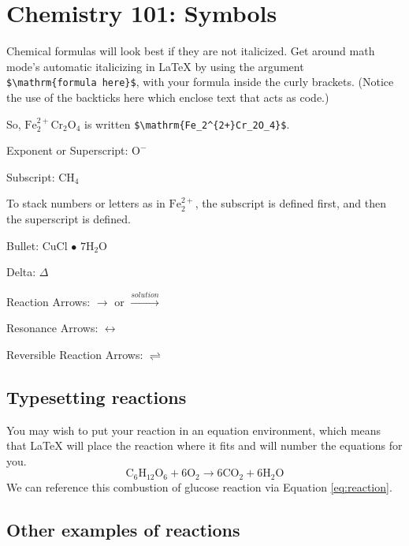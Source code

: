 \documentclass[12pt,twoside]{reedthesis}
\begin{document}
\hypertarget{chemistry-101-symbols}{%
\section{Chemistry 101: Symbols}\label{chemistry-101-symbols}}

Chemical formulas will look best if they are not italicized. Get around math mode's automatic italicizing in LaTeX by using the argument \texttt{\$\textbackslash{}mathrm\{formula\ here\}\$}, with your formula inside the curly brackets. (Notice the use of the backticks here which enclose text that acts as code.)

So, \(\mathrm{Fe_2^{2+}Cr_2O_4}\) is written \texttt{\$\textbackslash{}mathrm\{Fe\_2\^{}\{2+\}Cr\_2O\_4\}\$}.

\noindent Exponent or Superscript: \(\mathrm{O^-}\)

\noindent Subscript: \(\mathrm{CH_4}\)

To stack numbers or letters as in \(\mathrm{Fe_2^{2+}}\), the subscript is defined first, and then the superscript is defined.

\noindent Bullet: CuCl \(\bullet\) \(\mathrm{7H_{2}O}\)

\noindent Delta: \(\Delta\)

\noindent Reaction Arrows: \(\longrightarrow\) or \(\xrightarrow{solution}\)

\noindent Resonance Arrows: \(\leftrightarrow\)

\noindent Reversible Reaction Arrows: \(\rightleftharpoons\)

\hypertarget{typesetting-reactions}{%
\subsection{Typesetting reactions}\label{typesetting-reactions}}

You may wish to put your reaction in an equation environment, which means that LaTeX will place the reaction where it fits and will number the equations for you.
\begin{equation}
  \mathrm{C_6H_{12}O_6  + 6O_2} \longrightarrow \mathrm{6CO_2 + 6H_2O}
  \label{eq:reaction}
\end{equation}
We can reference this combustion of glucose reaction via Equation \eqref{eq:reaction}.

\hypertarget{other-examples-of-reactions}{%
\subsection{Other examples of reactions}\label{other-examples-of-reactions}}
\end{document}
